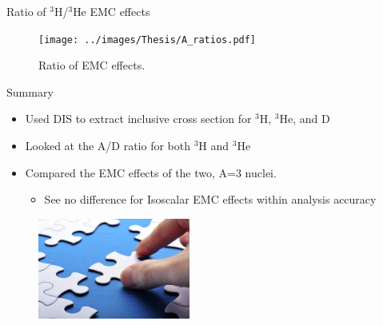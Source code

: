 \documentclass[12pt,usenames,dvipsnames]{beamer}
\begin{document}
\begin{frame}{Ratio of $^3$H/$^3$He EMC effects}
\vspace{-20pt}
\begin{figure}
	\texttt{[image: ../images/Thesis/A\_ratios.pdf]}
	\caption*{Ratio of EMC effects.}
\end{figure}
\end{frame}



\begin{frame}{}
\begin{block}{Summary}
	\begin{itemize}
		\item Used DIS to extract inclusive cross section for $^3$H, $^3$He, and D
		\item Looked at the A/D ratio for both $^3$H and $^3$He
		\item Compared the EMC effects of the two, A=3 nuclei. 
		\begin{itemize}
			\item See no difference for Isoscalar EMC effects within analysis accuracy
		\end{itemize}
	\end{itemize}
\centering
\end{block}

\begin{figure}
	\includegraphics[width =5cm]{../images/puzzle2.png}
\end{figure}

\end{frame}


\end{document}
